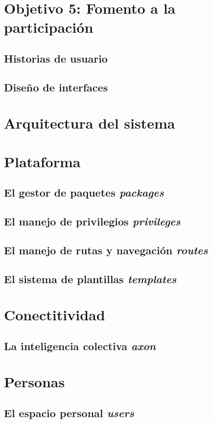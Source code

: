 \section{Objetivo 5: Fomento a la participación}
\subsection{Historias de usuario}
\subsection{Diseño de interfaces}

\section{Arquitectura del sistema}

\section{Plataforma}
\subsection{El gestor de paquetes \emph{packages}}
\subsection{El manejo de privilegios \emph{privileges}}
\subsection{El manejo de rutas y navegación \emph{routes}}
\subsection{El sistema de plantillas \emph{templates}}

\section{Conectitividad}
\subsection{La inteligencia colectiva \emph{axon}}

\section{Personas}
\subsection{El espacio personal \emph{users}}
